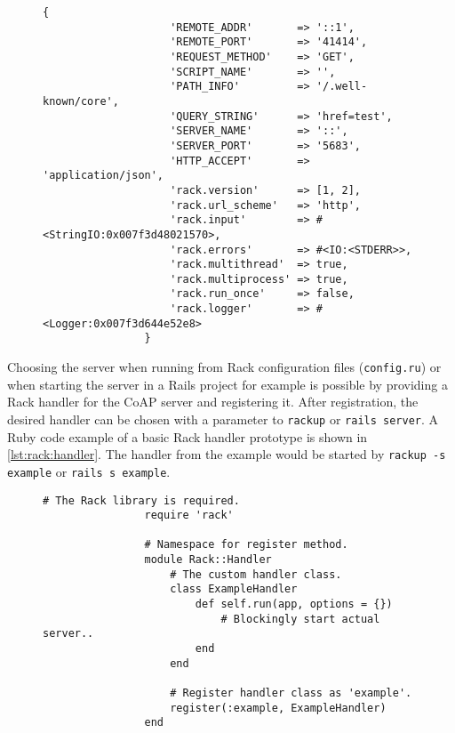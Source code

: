 		\begin{figure}
			\begin{lstlisting}[gobble=8,caption={Exemplary Rack environment},label=lst:rack:env]
				{
					'REMOTE_ADDR'       => '::1',
					'REMOTE_PORT'       => '41414',
					'REQUEST_METHOD'    => 'GET',
					'SCRIPT_NAME'       => '',
					'PATH_INFO'         => '/.well-known/core',
					'QUERY_STRING'      => 'href=test',
					'SERVER_NAME'       => '::',
					'SERVER_PORT'       => '5683',
					'HTTP_ACCEPT'       => 'application/json',
					'rack.version'      => [1, 2],
					'rack.url_scheme'   => 'http',
					'rack.input'        => #<StringIO:0x007f3d48021570>,
					'rack.errors'       => #<IO:<STDERR>>,
					'rack.multithread'  => true,
					'rack.multiprocess' => true,
					'rack.run_once'     => false,
					'rack.logger'       => #<Logger:0x007f3d644e52e8>
				}
			\end{lstlisting}
		\end{figure}

		Choosing the server when running from Rack configuration files
		(\texttt{config.ru}) or when starting the server in a \ac{Rails}
		project for example is possible by providing a Rack handler for the
		\ac{CoAP} server and registering it. After registration, the desired
		handler can be chosen with a parameter to \texttt{rackup} or
		\texttt{rails server}. A Ruby code example of a basic Rack handler
		prototype is shown in \autoref{lst:rack:handler}. The handler from the
		example would be started by \texttt{rackup -s example} or \texttt{rails
		s example}.

		\begin{figure}
			\begin{lstlisting}[gobble=8,caption={Rack handler prototype},label=lst:rack:handler]
				# The Rack library is required.
				require 'rack'

				# Namespace for register method.
				module Rack::Handler
					# The custom handler class.
					class ExampleHandler
						def self.run(app, options = {})
							# Blockingly start actual server..
						end
					end

					# Register handler class as 'example'.
					register(:example, ExampleHandler)
				end
			\end{lstlisting}
		\end{figure}

